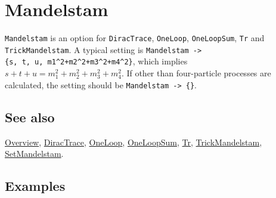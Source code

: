 \documentclass[../FeynCalcManual.tex]{subfiles}
\begin{document}
\hypertarget{mandelstam}{
\section{Mandelstam}\label{mandelstam}}

\texttt{Mandelstam} is an option for \texttt{DiracTrace},
\texttt{OneLoop}, \texttt{OneLoopSum}, \texttt{Tr} and
\texttt{TrickMandelstam}. A typical setting is
\texttt{Mandelstam -> \{\allowbreak{}s,\ \allowbreak{}t,\ \allowbreak{}u,\ \allowbreak{}m1^2+m2^2+m3^2+m4^2\}},
which implies \(s + t + u = m_1^2+m_2^2+m_3^2+m_4^2\). If other than
four-particle processes are calculated, the setting should be
\texttt{Mandelstam -> \{\allowbreak{}\}}.

\subsection{See also}

\hyperlink{toc}{Overview}, \hyperlink{diractrace}{DiracTrace},
\hyperlink{oneloop}{OneLoop}, \hyperlink{oneloopsum}{OneLoopSum},
\hyperlink{tr}{Tr}, \hyperlink{trickmandelstam}{TrickMandelstam},
\hyperlink{setmandelstam}{SetMandelstam}.

\subsection{Examples}
\end{document}
